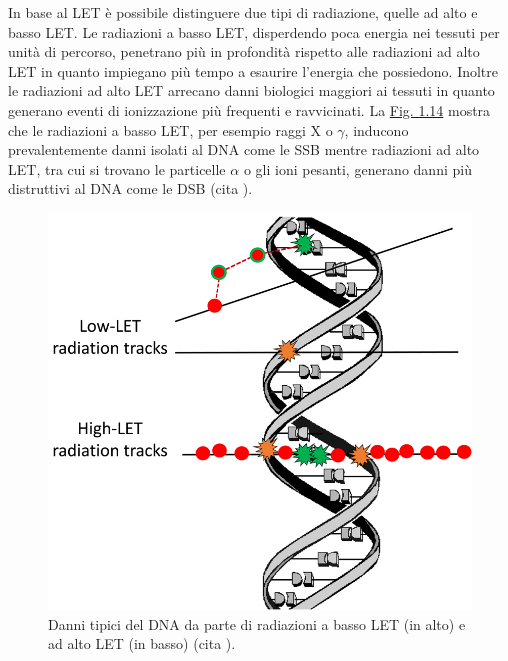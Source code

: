 \documentclass[12pt,a4paper,twoside]{report}
\begin{document}
	In base al LET è possibile distinguere due tipi di radiazione, quelle ad alto e basso LET. Le radiazioni a basso LET, disperdendo poca energia nei tessuti per unità di percorso, penetrano più in profondità rispetto alle radiazioni ad alto LET in quanto impiegano più tempo a esaurire l'energia che possiedono. Inoltre le radiazioni ad alto LET arrecano danni biologici maggiori ai tessuti in quanto generano eventi di ionizzazione più frequenti e ravvicinati. La \hyperref[fig:damage_let]{Fig. 1.14} mostra che le radiazioni a basso LET, per esempio raggi X o $\gamma$, inducono prevalentemente danni isolati al DNA come le SSB mentre radiazioni ad alto LET, tra cui si trovano le particelle $\alpha$ o gli ioni pesanti, generano danni più distruttivi al DNA come le DSB (cita
	).
	
	\begin{figure}[H]
		\centering
		\includegraphics[width=0.9\linewidth]{damage_let.png}
		\caption{Danni tipici del DNA da parte di radiazioni a basso LET (in alto) e ad alto LET (in basso) (cita
			).}
		\label{fig:damage_let}
	\end{figure}
	
\end{document}
